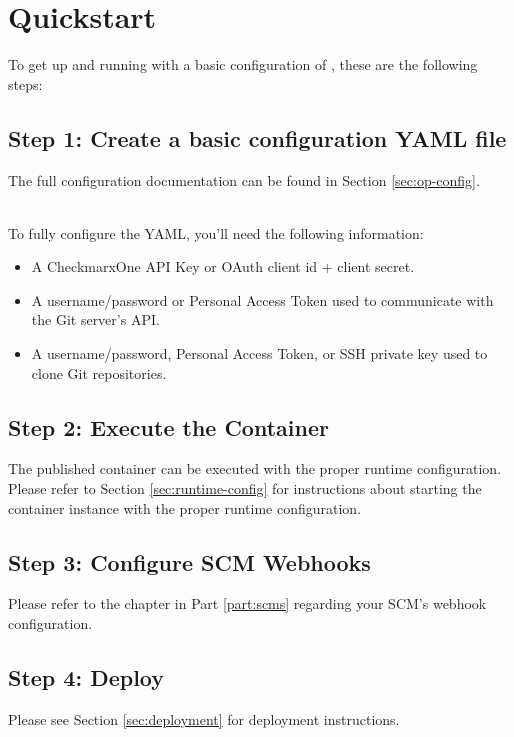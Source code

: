\chapter{Quickstart}

To get up and running with a basic configuration of \cxoneflow, these are the following steps:


\section{Step 1: Create a basic configuration YAML file}

The full configuration documentation can be found in Section \ref{sec:op-config}. 

\noindent\\To fully configure the YAML, you'll need the following information:

\begin{itemize}
    \item A CheckmarxOne API Key or OAuth client id + client secret.
    \item A username/password or Personal Access Token used to communicate with the Git server's API.
    \item A username/password, Personal Access Token, or SSH private key used to clone Git repositories.
\end{itemize}


\section{Step 2: Execute the \cxoneflow Container}

The published \cxoneflow container can be executed with the proper runtime configuration.  Please refer
to Section \ref{sec:runtime-config} for instructions about starting the \cxoneflow container instance with
the proper runtime configuration.


\section{Step 3: Configure SCM Webhooks}

Please refer to the chapter in Part \ref{part:scms} regarding your SCM's webhook configuration.

\section{Step 4: Deploy}

Please see Section \ref{sec:deployment} for deployment instructions.
